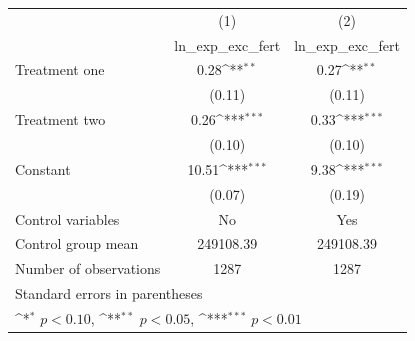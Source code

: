 {
\def\sym#1{\ifmmode^{#1}\else\(^{#1}\)\fi}
\begin{tabular}{l*{2}{c}}
\hline\hline
                    &\multicolumn{1}{c}{(1)}&\multicolumn{1}{c}{(2)}\\
                    &\multicolumn{1}{c}{ln\_exp\_exc\_fert}&\multicolumn{1}{c}{ln\_exp\_exc\_fert}\\
\hline
Treatment one       &        0.28\sym{**} &        0.27\sym{**} \\
                    &      (0.11)         &      (0.11)         \\
[1em]
Treatment two       &        0.26\sym{***}&        0.33\sym{***}\\
                    &      (0.10)         &      (0.10)         \\
[1em]
Constant            &       10.51\sym{***}&        9.38\sym{***}\\
                    &      (0.07)         &      (0.19)         \\
\hline
Control variables   &          No         &         Yes         \\
Control group mean  &   249108.39         &   249108.39         \\
Number of observations&        1287         &        1287         \\
\hline\hline
\multicolumn{3}{l}{\footnotesize Standard errors in parentheses}\\
\multicolumn{3}{l}{\footnotesize \sym{*} \(p<0.10\), \sym{**} \(p<0.05\), \sym{***} \(p<0.01\)}\\
\end{tabular}
}
